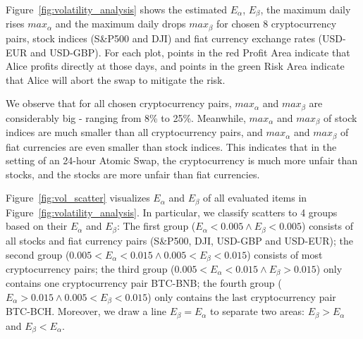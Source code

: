 Figure~\ref{fig:volatility_analysis} shows the estimated $E_\alpha$, $E_\beta$, the maximum daily rises $max_\alpha$ and the maximum daily drops $max_\beta$ for chosen 8 cryptocurrency pairs, stock indices (S\&P500 and DJI) and fiat currency exchange rates (USD-EUR and USD-GBP).
For each plot, points in the red Profit Area indicate that Alice profits directly at those days, and points in the green Risk Area indicate that Alice will abort the swap to mitigate the risk.

We observe that for all chosen cryptocurrency pairs, $max_\alpha$ and $max_\beta$ are considerably big - ranging from 8\% to 25\%.
Meanwhile, $max_\alpha$ and $max_\beta$ of stock indices are much smaller than all cryptocurrency pairs,
and $max_\alpha$ and $max_\beta$ of fiat currencies are even smaller than stock indices.
This indicates that in the setting of an 24-hour Atomic Swap, the cryptocurrency is much more unfair than stocks, and the stocks are more unfair than fiat currencies.


Figure~\ref{fig:vol_scatter} visualizes $E_\alpha$ and $E_\beta$ of all evaluated items in Figure~\ref{fig:volatility_analysis}.
In particular, we classify scatters to 4 groups based on their $E_\alpha$ and $E_\beta$:
The first group ($E_\alpha < 0.005 \wedge E_\beta < 0.005$) consists of all stocks and fiat currency pairs (S\&P500, DJI, USD-GBP and USD-EUR);
the second group ($0.005 < E_\alpha < 0.015 \wedge 0.005 < E_\beta < 0.015$) consists of most cryptocurrency pairs;
the third group ($0.005 < E_\alpha < 0.015 \wedge E_\beta > 0.015$) only contains one cryptocurrency pair BTC-BNB;
the fourth group ($E_\alpha > 0.015 \wedge 0.005 < E_\beta < 0.015$) only contains the last cryptocurrency pair BTC-BCH.
Moreover, we draw a line $E_\beta = E_\alpha$ to separate two areas: $E_\beta > E_\alpha$ and $E_\beta < E_\alpha$.


